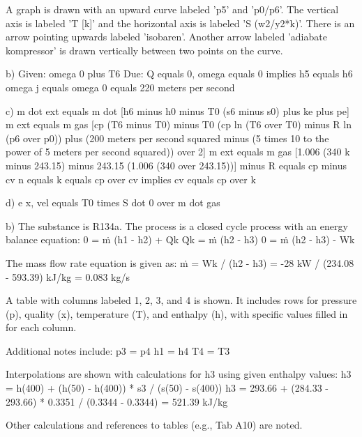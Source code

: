 A graph is drawn with an upward curve labeled 'p5' and 'p0/p6'. The vertical axis is labeled 'T [k]' and the horizontal axis is labeled 'S (w2/y2*k)'. There is an arrow pointing upwards labeled 'isobaren'. Another arrow labeled 'adiabate kompressor' is drawn vertically between two points on the curve.

b) Given: omega 0 plus T6  
Due: Q equals 0, omega equals 0 implies h5 equals h6  
omega j equals omega 0 equals 220 meters per second

c) m dot ext equals m dot [h6 minus h0 minus T0 (s6 minus s0) plus ke plus pe]  
m ext equals m gas [cp (T6 minus T0) minus T0 (cp ln (T6 over T0) minus R ln (p6 over p0)) plus (200 meters per second squared minus (5 times 10 to the power of 5 meters per second squared)) over 2]  
m ext equals m gas [1.006 (340 k minus 243.15) minus 243.15 (1.006 (340 over 243.15))] minus  
R equals cp minus cv  
n equals k equals cp over cv implies cv equals cp over k

d) e x, vel equals T0 times S dot 0 over m dot gas

b) The substance is R134a. The process is a closed cycle process with an energy balance equation: 
0 = ṁ (h1 - h2) + Q̇k
Q̇k = ṁ (h2 - h3)
0 = ṁ (h2 - h3) - Wk

The mass flow rate equation is given as:
ṁ = Wk / (h2 - h3) = -28 kW / (234.08 - 593.39) kJ/kg = 0.083 kg/s

A table with columns labeled 1, 2, 3, and 4 is shown. It includes rows for pressure (p), quality (x), temperature (T), and enthalpy (h), with specific values filled in for each column.

Additional notes include:
p3 = p4
h1 = h4
T4 = T3

Interpolations are shown with calculations for h3 using given enthalpy values:
h3 = h(400) + (h(50) - h(400)) * s3 / (s(50) - s(400))
h3 = 293.66 + (284.33 - 293.66) * 0.3351 / (0.3344 - 0.3344) = 521.39 kJ/kg

Other calculations and references to tables (e.g., Tab A10) are noted.